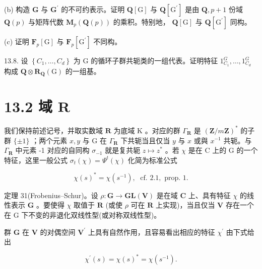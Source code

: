 \documentclass[10pt]{article}
\begin{document}
(b) 构造 \(\mathbf{G}\) 与 \({\mathbf{G}}^{\prime }\) 的不可约表示。证明 \(\mathbf{Q}\left\lbrack  \mathrm{G}\right\rbrack\) 与 \(\mathbf{Q}\left\lbrack  {\mathrm{G}}^{\prime }\right\rbrack\) 是由 \(\mathbf{Q},p + 1\) 份域 \(\mathbf{Q}\left( p\right)\) 与矩阵代数 \({\mathbf{M}}_{p}\left( {\mathbf{Q}\left( p\right) }\right)\) 的乘积。特别地， \(\mathbf{Q}\left\lbrack  \mathrm{G}\right\rbrack\) 与 \(\mathbf{Q}\left\lbrack  {\mathrm{G}}^{\prime }\right\rbrack\) 同构。

(c) 证明 \({\mathbf{F}}_{p}\left\lbrack  \mathrm{G}\right\rbrack\) 与 \({\mathbf{F}}_{p}\left\lbrack  {\mathrm{G}}^{\prime }\right\rbrack\) 不同构。

13.8. 设 \(\left\{  {{C}_{1},\ldots ,{C}_{d}}\right\}\) 为 G 的循环子群共轭类的一组代表。证明特征 \({1}_{{C}_{1}}^{G},\ldots ,{1}_{{C}_{d}}^{G}\) 构成 \(\mathbf{Q} \otimes  {\mathbf{R}}_{\mathbf{Q}}\left( \mathrm{G}\right)\) 的一组基。

\section*{13.2 域 \(\mathbf{R}\)}

我们保持前述记号，并取实数域 \(\mathbf{R}\) 为底域 \(\mathrm{K}\) 。对应的群 \({\Gamma }_{\mathbf{R}}\) 是 \({\left( \mathbf{Z}/m\mathbf{Z}\right) }^{ * }\) 的子群 \(\{  \pm  1\}\) ；两个元素 \(x,y\) 与 \(\mathrm{G}\) 在 \({\Gamma }_{\mathbf{R}}\) 下共轭当且仅当 \(y\) 与 \(x\) 或與 \({x}^{-1}\) 共轭。与 \({\Gamma }_{\mathbf{R}}\) 中元素 -1 对应的自同构 \({\sigma }_{-1}\) 就是复共轭 \(z \mapsto  {z}^{ * }\) 。若 \(\chi\) 是在 \(\mathrm{C}\) 上的 G 的一个特征，这里一般公式 \({\sigma }_{t}\left( \chi \right)  = {\Psi }^{t}\left( \chi \right)\) 化简为标准公式

\[
\chi {\left( s\right) }^{ * } = \chi \left( {s}^{-1}\right) ,\;\text{ cf. }{2.1},\text{ prop. }1.
\]

定理 31(Frobenius–Schur)。设 \(\rho  : \mathbf{G} \rightarrow  \mathbf{{GL}}\left( \mathbf{V}\right)\) 是在域 \(\mathbf{C}\) 上、具有特征 \(\chi\) 的线性表示 \(\mathbf{G}\) 。要使得 \(\chi\) 取值于 \(\mathbf{R}\) (或使 \(\rho\) 可在 \(\mathbf{R}\) 上实现)，当且仅当 \(\mathbf{V}\) 存在一个在 G 下不变的非退化双线性型(或对称双线性型)。

群 \(\mathbf{G}\) 在 \(\mathbf{V}\) 的对偶空间 \({\mathbf{V}}^{\prime }\) 上具有自然作用，且容易看出相应的特征 \({\chi }^{\prime }\) 由下式给出

\[
{\chi }^{\prime }\left( s\right)  = \chi {\left( s\right) }^{ * } = \chi \left( {s}^{-1}\right) .
\]
\end{document}
